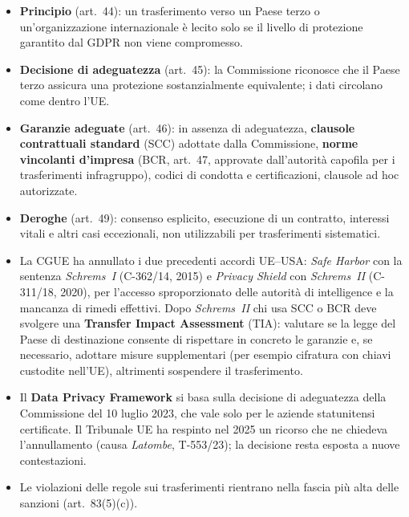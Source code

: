 \begin{integrazione}
\begin{itemize}
  \item \textbf{Principio} (art.~44): un trasferimento verso un Paese terzo o un'organizzazione
    internazionale è lecito solo se il livello di protezione garantito dal GDPR non viene compromesso.
  \item \textbf{Decisione di adeguatezza} (art.~45): la Commissione riconosce che il Paese terzo
    assicura una protezione sostanzialmente equivalente; i dati circolano come dentro l'UE.
  \item \textbf{Garanzie adeguate} (art.~46): in assenza di adeguatezza, \textbf{clausole contrattuali
    standard} (SCC) adottate dalla Commissione, \textbf{norme vincolanti d'impresa} (BCR, art.~47,
    approvate dall'autorità capofila per i trasferimenti infragruppo), codici di condotta e
    certificazioni, clausole ad hoc autorizzate.
  \item \textbf{Deroghe} (art.~49): consenso esplicito, esecuzione di un contratto, interessi vitali e
    altri casi eccezionali, non utilizzabili per trasferimenti sistematici.
  \item La CGUE ha annullato i due precedenti accordi UE--USA: \emph{Safe Harbor} con la sentenza
    \emph{Schrems~I} (C-362/14, 2015) e \emph{Privacy Shield} con \emph{Schrems~II} (C-311/18, 2020),
    per l'accesso sproporzionato delle autorità di intelligence e la mancanza di rimedi effettivi. Dopo
    \emph{Schrems~II} chi usa SCC o BCR deve svolgere una \textbf{Transfer Impact Assessment} (TIA):
    valutare se la legge del Paese di destinazione consente di rispettare in concreto le garanzie e,
    se necessario, adottare misure supplementari (per esempio cifratura con chiavi custodite nell'UE),
    altrimenti sospendere il trasferimento.
  \item Il \textbf{Data Privacy Framework} si basa sulla decisione di adeguatezza della Commissione del
    10 luglio 2023, che vale solo per le aziende statunitensi certificate. Il Tribunale UE ha respinto
    nel 2025 un ricorso che ne chiedeva l'annullamento (causa \emph{Latombe}, T-553/23); la decisione
    resta esposta a nuove contestazioni.
  \item Le violazioni delle regole sui trasferimenti rientrano nella fascia più alta delle sanzioni
    (art.~83(5)(c)).
\end{itemize}
\end{integrazione}

